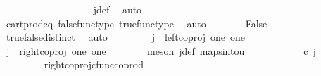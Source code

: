 \begin{isabellebody}
\ \ \ \ \isamarkupfalse%
\ \isamarkupfalse%
\ {\isachardoublequoteopen}{\isasymlangle}{\isasymt}{\isacharcomma}{\kern0pt}\ {\isasymf}{\isasymrangle}\ {\isacharequal}{\kern0pt}\ {\isasymlangle}{\isasymt}{\isacharcomma}{\kern0pt}{\isasymt}{\isasymrangle}{\isachardoublequoteclose}\isanewline
\ \ \ \ \ \ \isamarkupfalse%
\ j{\isacharunderscore}{\kern0pt}def\ \isamarkupfalse%
\ auto\isanewline
\ \ \ \ \isamarkupfalse%
\ \isamarkupfalse%
\ {\isachardoublequoteopen}{\isasymt}\ {\isacharequal}{\kern0pt}\ {\isasymf}{\isachardoublequoteclose}\isanewline
\ \ \ \ \ \ \isamarkupfalse%
\ cart{\isacharunderscore}{\kern0pt}prod{\isacharunderscore}{\kern0pt}eq{}\ false{\isacharunderscore}{\kern0pt}func{\isacharunderscore}{\kern0pt}type\ true{\isacharunderscore}{\kern0pt}func{\isacharunderscore}{\kern0pt}type\ \isamarkupfalse%
\ auto\isanewline
\ \ \ \ \isamarkupfalse%
\ \isamarkupfalse%
\ False\isanewline
\ \ \ \ \ \ \isamarkupfalse%
\ true{\isacharunderscore}{\kern0pt}false{\isacharunderscore}{\kern0pt}distinct\ \isamarkupfalse%
\ auto\isanewline
\ \ \isamarkupfalse%
\isanewline
\ \ \ \ \isamarkupfalse%
\ {\isachardoublequoteopen}j\ {\isasymnoteq}\ left{\isacharunderscore}{\kern0pt}coproj\ one\ one{\isachardoublequoteclose}\isanewline
\ \ \ \ \isamarkupfalse%
\ \isamarkupfalse%
\ {\isachardoublequoteopen}j\ {\isacharequal}{\kern0pt}\ right{\isacharunderscore}{\kern0pt}coproj\ one\ one{\isachardoublequoteclose}\isanewline
\ \ \ \ \ \ \isamarkupfalse%
\ {\isacharparenleft}{\kern0pt}meson\ j{\isacharunderscore}{\kern0pt}def\ maps{\isacharunderscore}{\kern0pt}into{\isacharunderscore}{\kern0pt}{}u{}{\isacharparenright}{\kern0pt}\isanewline
\ \ \ \ \isamarkupfalse%
\ \isamarkupfalse%
\ {\isachardoublequoteopen}{\isacharparenleft}{\kern0pt}{\isasymlangle}{\isasymt}{\isacharcomma}{\kern0pt}\ {\isasymf}{\isasymrangle}\ {\isasymamalg}{\isasymlangle}{\isasymf}{\isacharcomma}{\kern0pt}\ {\isasymt}{\isasymrangle}{\isacharparenright}{\kern0pt}\ {\isasymcirc}\isactrlsub c\ j\ \ {\isacharequal}{\kern0pt}\ {\isasymlangle}{\isasymf}{\isacharcomma}{\kern0pt}\ {\isasymt}{\isasymrangle}{\isachardoublequoteclose}\isanewline
\ \ \ \ \ \ \isamarkupfalse%
\ \ right{\isacharunderscore}{\kern0pt}coproj{\isacharunderscore}{\kern0pt}cfunc{\isacharunderscore}{\kern0pt}coprod\ \isamarkupfalse%

\end{isabellebody}
